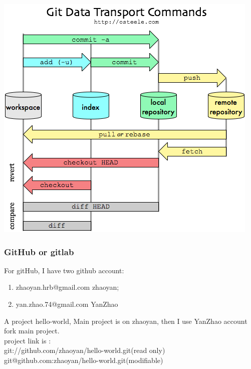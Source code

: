 \documentclass[a4paper,12pt,twoside]{book}
\begin{document}
 \includegraphics[scale=0.8]{pics/git-transport} \\

\subsubsection{GitHub or gitlab}
For gitHub, I have two github account:
\begin{enumerate}
	  \item zhaoyan.hrb@gmail.com  zhaoyan;
  \item yan.zhao.74@gmail.com YanZhao
\end{enumerate}
A project hello-world, Main project is on zhaoyan, then I use YanZhao account fork main project. \\
project link is : \\
git://github.com/zhaoyan/hello-world.git(read only) \\
git@github.com:zhaoyan/hello-world.git(modifiable)
\end{document}
